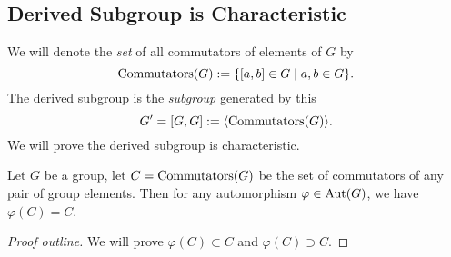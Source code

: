 \subsection{Derived Subgroup is Characteristic}
We will denote the \emph{set} of all commutators of elements of $G$ by
\begin{equation}
\operatorname{Commutators}(G) := \{[a,b]\in G\mid a,b\in G\}.
\end{equation}
The derived subgroup is the \emph{subgroup} generated by this
\begin{equation}
G' = [G,G] := \langle\operatorname{Commutators}(G)\rangle.
\end{equation}
We will prove the derived subgroup is characteristic.

\begin{theorem}
Let $G$ be a group, let $C=\operatorname{Commutators}(G)$ be the set of
commutators of any pair of group elements. Then for any automorphism
$\varphi\in\operatorname{Aut}(G)$, we have $\varphi(C) = C$.
\end{theorem}

\begin{proof}[Proof outline]
We will prove $\varphi(C)\subset C$ and $\varphi(C)\supset C$.
\end{proof}

